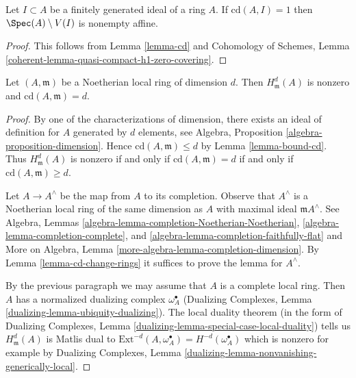 \begin{lemma}
\label{lemma-cd-is-one}
Let $I \subset A$ be a finitely generated ideal of a ring $A$. If
$\text{cd}(A, I) = 1$ then $\Spec(A) \setminus V(I)$ is nonempty affine.
\end{lemma}

\begin{proof}
This follows from Lemma \ref{lemma-cd} and
Cohomology of Schemes, Lemma
\ref{coherent-lemma-quasi-compact-h1-zero-covering}.
\end{proof}

\begin{lemma}
\label{lemma-cd-maximal}
Let $(A, \mathfrak m)$ be a Noetherian local ring of dimension $d$.
Then $H^d_\mathfrak m(A)$ is nonzero and $\text{cd}(A, \mathfrak m) = d$.
\end{lemma}

\begin{proof}
By one of the characterizations of dimension, there exists
an ideal of definition for $A$ generated by $d$ elements, see
Algebra, Proposition \ref{algebra-proposition-dimension}.
Hence $\text{cd}(A, \mathfrak m) \leq d$ by
Lemma \ref{lemma-bound-cd}. Thus $H^d_\mathfrak m(A)$ is
nonzero if and only if $\text{cd}(A, \mathfrak m) = d$ if and only if
$\text{cd}(A, \mathfrak m) \geq d$.

\medskip\noindent
Let $A \to A^\wedge$ be the map from $A$ to its completion.
Observe that $A^\wedge$ is a Noetherian local ring of the
same dimension as $A$ with maximal ideal $\mathfrak m A^\wedge$.
See Algebra, Lemmas
\ref{algebra-lemma-completion-Noetherian-Noetherian},
\ref{algebra-lemma-completion-complete}, and
\ref{algebra-lemma-completion-faithfully-flat} and
More on Algebra, Lemma \ref{more-algebra-lemma-completion-dimension}.
By Lemma \ref{lemma-cd-change-rings}
it suffices to prove the lemma for $A^\wedge$.

\medskip\noindent
By the previous paragraph we may assume that $A$ is
a complete local ring. Then $A$ has a normalized dualizing complex
$\omega_A^\bullet$ (Dualizing Complexes, Lemma
\ref{dualizing-lemma-ubiquity-dualizing}).
The local duality theorem (in the form of
Dualizing Complexes, Lemma \ref{dualizing-lemma-special-case-local-duality})
tells us $H^d_\mathfrak m(A)$ is Matlis dual to
$\text{Ext}^{-d}(A, \omega_A^\bullet) = H^{-d}(\omega_A^\bullet)$
which is nonzero for example by
Dualizing Complexes, Lemma
\ref{dualizing-lemma-nonvanishing-generically-local}.
\end{proof}

